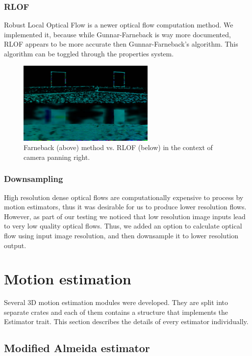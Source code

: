 \documentclass[11pt,english]{report}
\begin{document}
\subsubsection{RLOF}

Robust Local Optical Flow is a newer optical flow computation method. We implemented it, because while Gunnar-Farneback is way more documented, RLOF appears to be more accurate then Gunnar-Farneback's algorithm. This algorithm can be toggled through the properties system.

\begin{figure}[!ht]
	\centering
	\includegraphics[width=190pt]{docs/report/farneback-vs-rlof.jpg}
	\caption{\centering Farneback (above) method vs. RLOF (below) in the context of camera panning right.}
\end{figure}

\subsubsection{Downsampling}

High resolution dense optical flows are computationally expensive to process by motion estimators, thus it was desirable for us to produce lower resolution flows. However, as part of our testing we noticed that low resolution image inputs lead to very low quality optical flows. Thus, we added an option to calculate optical flow using input image resolution, and then downsample it to lower resolution output.

\section{Motion estimation}

Several 3D motion estimation modules were developed. They are split into separate crates and each of them contains a structure that implements the Estimator trait. This section describes the details of every estimator individually.

\subsection{Modified Almeida estimator}
\end{document}
